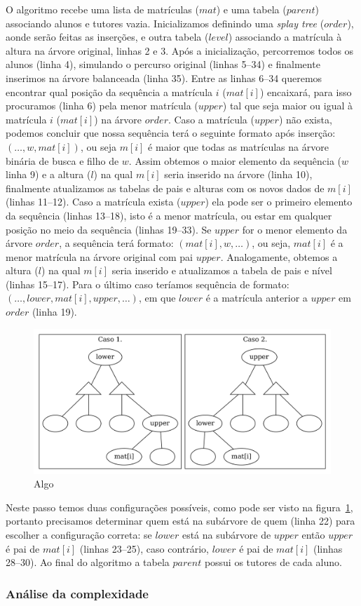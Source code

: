 O algoritmo recebe uma lista de matrículas ($mat$) e uma tabela ($parent$) associando alunos e
tutores vazia. Inicializamos definindo uma \textit{splay tree} ($order$), aonde
serão feitas as inserções, e outra tabela ($level$) associando a matrícula à
altura na árvore original, linhas 2 e 3. Após a inicialização, percorremos todos
os alunos (linha 4), simulando o percurso original (linhas 5--34) e finalmente
inserimos na árvore balanceada (linha 35). Entre as linhas 6--34 queremos
encontrar qual posição da sequência a matrícula $i$ ($mat[i]$) encaixará,
para isso procuramos (linha 6) pela menor matrícula ($upper$) tal que seja maior
ou igual à matrícula $i$ ($mat[i]$) na árvore $order$. Caso a matrícula ($upper$) não
exista, podemos concluir que nossa sequência terá o seguinte formato após inserção: $(\ldots,
w,mat[i])$, ou seja $m[i]$ é maior que todas as matrículas na árvore binária de
busca e filho de $w$. Assim obtemos o maior elemento da sequência ($w$ linha
9) e a altura ($l$) na qual $m[i]$ seria inserido na árvore (linha 10),
finalmente atualizamos as tabelas de pais e alturas com os novos dados de $m[i]$
(linhas 11--12). Caso a matrícula exista ($upper$) ela pode ser o primeiro
elemento da sequência (linhas 13--18), isto é a menor matrícula, ou estar em qualquer posição no
meio da sequência (linhas 19--33). Se $upper$ for o menor elemento da árvore
$order$, a sequência terá formato: $(mat[i], w, \ldots)$, ou seja, $mat[i]$ é a
menor matrícula na árvore original com pai $upper$. Analogamente, obtemos a altura ($l$) na qual
$m[i]$ seria inserido e atualizamos a tabela de pais e nível (linhas 15--17).
Para o último caso teríamos sequência de formato: $(\ldots, lower, mat[i],
upper, \ldots)$, em que $lower$ é a matrícula anterior a $upper$ em $order$
(linha 19).
\begin{figure}[!htb]
  \centering
  \includegraphics[width=0.7\linewidth]{lxu.png}
  \caption{Algo}
  \label{fig:lxu}
\end{figure}
Neste passo temos duas configurações possíveis, como pode ser visto
na figura~\ref{fig:lxu}, portanto precisamos determinar quem está na subárvore
de quem (linha 22) para escolher a configuração correta: se $lower$ está na
subárvore de $upper$ então $upper$ é pai de $mat[i]$ (linhas 23--25), caso
contrário, $lower$ é pai de $mat[i]$ (linhas 28--30). Ao final do algoritmo a
tabela $parent$ possui os tutores de cada aluno.

\subsubsection{Análise da complexidade}
